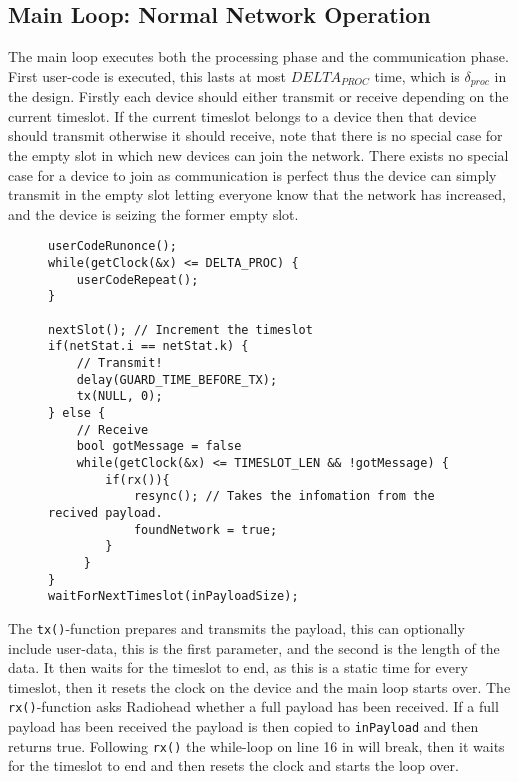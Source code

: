 \subsection{Main Loop: Normal Network Operation}
The main loop executes both the processing phase and the communication phase.
First user-code is executed, this lasts at most \texttt{$DELTA_{PROC}$} time, which is $\delta_{proc}$ in the design. 
Firstly each device should either transmit or receive depending on the current timeslot. 
If the current timeslot belongs to a device then that device should transmit otherwise it should receive, note that there is no special case for the empty slot in which new devices can join the network.
There exists no special case for a device to join as communication is perfect thus the device can simply transmit in the empty slot letting everyone know that the network has increased, and the device is seizing the former empty slot.
\begin{figure}
\begin{lstlisting}[style=customc,caption={Important parts of the main loop.},label={lst:ccrc:rxortx}]
userCodeRunonce();
while(getClock(&x) <= DELTA_PROC) {
    userCodeRepeat();
}

nextSlot(); // Increment the timeslot
if(netStat.i == netStat.k) { 
    // Transmit!
    delay(GUARD_TIME_BEFORE_TX);
    tx(NULL, 0);
} else {
    // Receive
    bool gotMessage = false
    while(getClock(&x) <= TIMESLOT_LEN && !gotMessage) {
        if(rx()){
            resync(); // Takes the infomation from the recived payload.
            foundNetwork = true;
        }
     }
}
waitForNextTimeslot(inPayloadSize);
\end{lstlisting}
\end{figure}

The \texttt{tx()}-function prepares and transmits the payload, this can optionally include user-data, this is the first parameter, and the second is the length of the data.
It then waits for the timeslot to end, as this is a static time for every timeslot, then it resets the clock on the device and the main loop starts over.
The \texttt{rx()}-function asks Radiohead whether a full payload has been received. 
If a full payload has been received the payload is then copied to \texttt{inPayload} and then returns true.
Following \texttt{rx()} the while-loop on line 16 in  will break, then it waits for the timeslot to end and then resets the clock and starts the loop over. 